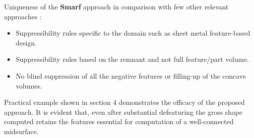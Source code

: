 Uniqueness of the {\bf Smarf} approach in comparison with few other relevant approaches \cite{Kannan2009,SangHunLee2005,Russ2012}:
	\begin{itemize}
	[noitemsep,topsep=2pt,parsep=2pt,partopsep=2pt]
	\item Suppressibility rules specific to the domain such as sheet metal feature-based design. 
	\item Suppressibility rules based on the remnant and not full feature/part volume.
	\item No blind suppression of all the negative features or filling-up of the concave volumes.
\end{itemize}
\bigskip
Practical example shown in section 4 demonstrates the efficacy of the proposed approach. It is evident that, even after substantial defeaturing the gross shape computed retains the features essential for computation of a well-connected midsurface.
